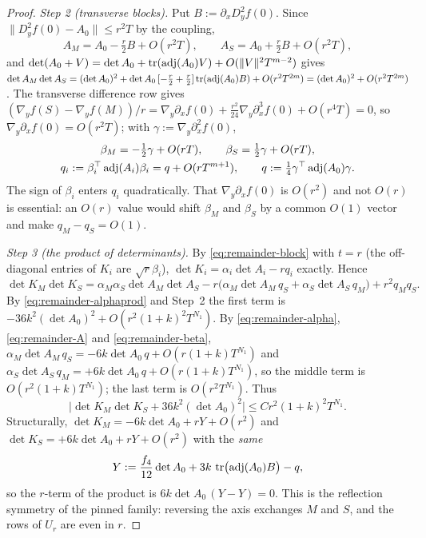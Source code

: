 \begin{proof}
\emph{Step 2 (transverse blocks).} Put $B:=\partial_xD_y^2f(0)$. Since $\|D_y^2f(0)-A_0\|\le r^2T$ by the coupling,
\begin{equation}\label{eq:remainder-A}
A_M=A_0-\tfrac r2B+O(r^2T),\qquad A_S=A_0+\tfrac r2B+O(r^2T),
\end{equation}
and $\det(A_0+V)=\det A_0+\operatorname{tr}(\operatorname{adj}(A_0)V)+O(\|V\|^2T^{m-2})$ gives $\det A_M\det A_S=(\det A_0)^2+\det A_0\,[-\tfrac r2+\tfrac r2]\operatorname{tr}(\operatorname{adj}(A_0)B)+O(r^2T^{2m})=(\det A_0)^2+O(r^2T^{2m})$. The transverse difference row gives $(\nabla_yf(S)-\nabla_yf(M))/r=\nabla_y\partial_xf(0)+\frac{r^2}{24}\nabla_y\partial_x^3f(0)+O(r^4T)=0$, so $\nabla_y\partial_xf(0)=O(r^2T)$; with $\gamma:=\nabla_y\partial_x^2f(0)$,
\begin{equation}\label{eq:remainder-beta}
\begin{gathered}
\beta_M=-\tfrac12\gamma+O(rT),\qquad \beta_S=\tfrac12\gamma+O(rT),\\
q_i:=\beta_i^{\top}\operatorname{adj}(A_i)\beta_i=q+O(rT^{m+1}),\qquad q:=\tfrac14\gamma^{\top}\operatorname{adj}(A_0)\gamma .
\end{gathered}
\end{equation}
The sign of $\beta_i$ enters $q_i$ quadratically. That $\nabla_y\partial_xf(0)$ is $O(r^2)$ and not $O(r)$ is essential: an $O(r)$ value would shift $\beta_M$ and $\beta_S$ by a common $O(1)$ vector and make $q_M-q_S=O(1)$.

\emph{Step 3 (the product of determinants).} By \eqref{eq:remainder-block} with $t=r$ (the off-diagonal entries of $K_i$ are $\sqrt r\beta_i$), $\det K_i=\alpha_i\det A_i-rq_i$ exactly. Hence
\[
\det K_M\det K_S=\alpha_M\alpha_S\det A_M\det A_S-r\bigl(\alpha_M\det A_M\,q_S+\alpha_S\det A_S\,q_M\bigr)+r^2q_Mq_S .
\]
By \eqref{eq:remainder-alphaprod} and Step~2 the first term is $-36k^2(\det A_0)^2+O(r^2(1+k)^2T^{N_1})$. By \eqref{eq:remainder-alpha}, \eqref{eq:remainder-A} and \eqref{eq:remainder-beta}, $\alpha_M\det A_M\,q_S=-6k\det A_0\,q+O(r(1+k)T^{N_1})$ and $\alpha_S\det A_S\,q_M=+6k\det A_0\,q+O(r(1+k)T^{N_1})$, so the middle term is $O(r^2(1+k)T^{N_1})$; the last term is $O(r^2T^{N_1})$. Thus
\begin{equation}\label{eq:remainder-prod}
\bigl|\det K_M\det K_S+36k^2(\det A_0)^2\bigr|\le Cr^2(1+k)^2T^{N_1}.
\end{equation}
Structurally, $\det K_M=-6k\det A_0+rY+O(r^2)$ and $\det K_S=+6k\det A_0+rY+O(r^2)$ with the \emph{same}
\begin{equation}\label{eq:remainder-Y}
Y:=\frac{f_4}{12}\det A_0+3k\,\operatorname{tr}\bigl(\operatorname{adj}(A_0)B\bigr)-q,
\end{equation}
so the $r$-term of the product is $6k\det A_0\,(Y-Y)=0$. This is the reflection symmetry of the pinned family: reversing the axis exchanges $M$ and $S$, and the rows of $U_r$ are even in $r$.


\end{proof}
